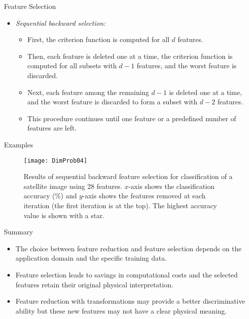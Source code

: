 \begin{frame}{Feature Selection}
\begin{itemize}
\item \textit{\color{mycolor2}Sequential backward selection:}
\begin{itemize}
\item First, the criterion function is computed for all $d$ features.
\item Then, each feature is deleted one at a time, the criterion
function is computed for all subsets with $d - 1$ features, and
the worst feature is discarded.
\item Next, each feature among the remaining $d - 1$ is deleted one
at a time, and the worst feature is discarded to form a subset
with $d - 2$ features.
\item This procedure continues until one feature or a predefined
number of features are left.
\end{itemize}
\end{itemize}
\end{frame}


\begin{frame}{Examples}
\begin{figure}
\texttt{[image: DimProb04]}
\caption{Results of sequential backward feature selection for classification of a satellite image using 28 features. $x$-axis shows the classification accuracy (\%) and $y$-axis shows the features removed at each iteration (the first iteration is
at the top). The highest accuracy value is shown with a star.}
\end{figure}
\end{frame}

\begin{frame}{Summary}
\begin{itemize}
\item The choice between feature reduction and feature selection
depends on the application domain and the specific training
data.
\item Feature selection leads to savings in computational costs
and the selected features retain their original physical
interpretation.
\item Feature reduction with transformations may provide a better
discriminative ability but these new features may not have a
clear physical meaning.
\end{itemize}
\end{frame}

